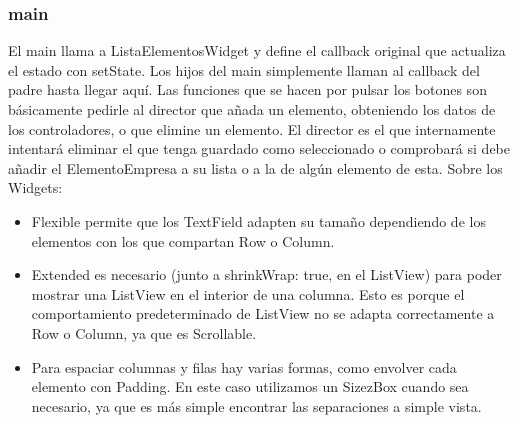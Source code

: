 \documentclass[
]{article}
\begin{document}
\subsubsection{main}\label{main}

El main llama a ListaElementosWidget y define el callback original que
actualiza el estado con setState. Los hijos del main simplemente llaman
al callback del padre hasta llegar aquí. Las funciones que se hacen por
pulsar los botones son básicamente pedirle al director que añada un
elemento, obteniendo los datos de los controladores, o que elimine un
elemento. El director es el que internamente intentará eliminar el que
tenga guardado como seleccionado o comprobará si debe añadir el
ElementoEmpresa a su lista o a la de algún elemento de esta. Sobre los
Widgets:

\begin{itemize}
\item
  Flexible permite que los TextField adapten su tamaño dependiendo de
  los elementos con los que compartan Row o Column.
\item
  Extended es necesario (junto a shrinkWrap: true, en el ListView) para
  poder mostrar una ListView en el interior de una columna. Esto es
  porque el comportamiento predeterminado de ListView no se adapta
  correctamente a Row o Column, ya que es Scrollable.
\item
  Para espaciar columnas y filas hay varias formas, como envolver cada
  elemento con Padding. En este caso utilizamos un SizezBox cuando sea
  necesario, ya que es más simple encontrar las separaciones a simple
  vista.
\end{itemize}
\end{document}
